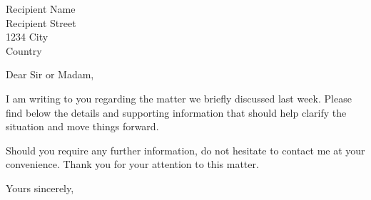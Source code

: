 \documentclass[a4paper, fromalign=right, fromphone=true, fromemail=true]{scrlttr2}
\begin{document}
\begin{letter}{Recipient Name \\ Recipient Street \\ 1234 City \\ Country}


\opening{Dear Sir or Madam,}

I am writing to you regarding the matter we briefly discussed last week. Please find below the details and supporting information that should help clarify the situation and move things forward.

Should you require any further information, do not hesitate to contact me at your convenience. Thank you for your attention to this matter.

\closing{Yours sincerely,}


\end{letter}
\end{document}
